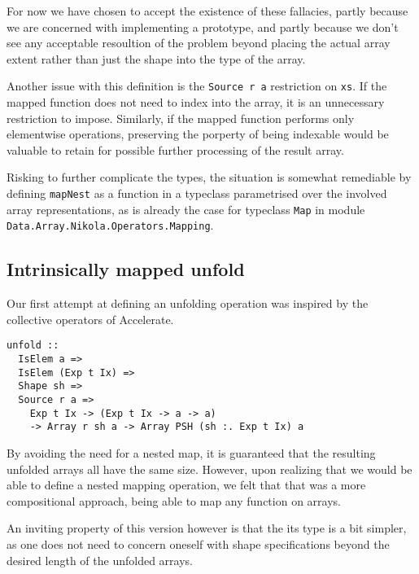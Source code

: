 For now we have chosen to accept the existence of these fallacies, partly
because we are concerned with implementing a prototype, and partly because we
don't see any acceptable resoultion of the problem beyond placing the actual
array extent rather than just the shape into the type of the array.

Another issue with this definition is the \texttt{Source r a} restriction on
\texttt{xs}. If the mapped function does not need to index into the array, it
is an unnecessary restriction to impose.  Similarly, if the mapped function
performs only elementwise operations, preserving the porperty of being
indexable would be valuable to retain for possible further processing of the
result array.

Risking to further complicate the types, the situation is somewhat remediable
by defining \texttt{mapNest} as a function in a typeclass parametrised over the
involved array representations, as is already the case for typeclass
\texttt{Map} in module \texttt{Data.Array.Nikola.Operators.Mapping}.

\subsection{Intrinsically mapped unfold}

Our first attempt at defining an unfolding operation was inspired by the
collective operators of Accelerate.

\begin{verbatim}
unfold ::
  IsElem a =>
  IsElem (Exp t Ix) =>
  Shape sh =>
  Source r a =>
    Exp t Ix -> (Exp t Ix -> a -> a)
    -> Array r sh a -> Array PSH (sh :. Exp t Ix) a
\end{verbatim}

By avoiding the need for a nested map, it is guaranteed that the resulting
unfolded arrays all have the same size. However, upon realizing that we would
be able to define a nested mapping operation, we felt that that was a more
compositional approach, being able to map any function on arrays.

An inviting property of this version however is that the its type is a bit
simpler, as one does not need to concern oneself with shape specifications
beyond the desired length of the unfolded arrays.

